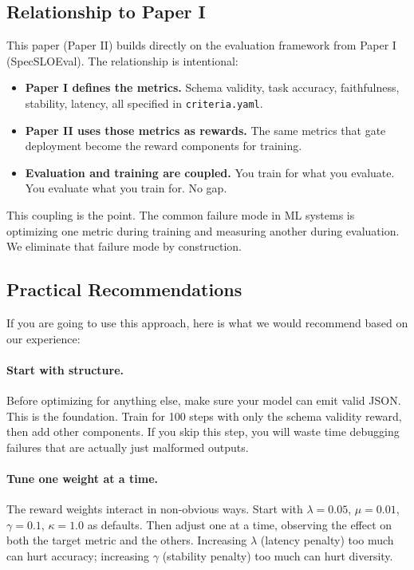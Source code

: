 \documentclass[11pt]{article}
\begin{document}
\subsection{Relationship to Paper I}

This paper (Paper II) builds directly on the evaluation framework from Paper I (SpecSLOEval).
The relationship is intentional:

\begin{itemize}[leftmargin=12pt]
    \item \textbf{Paper I defines the metrics.} Schema validity, task accuracy, faithfulness, stability, latency, all specified in \texttt{criteria.yaml}.
    \item \textbf{Paper II uses those metrics as rewards.} The same metrics that gate deployment become the reward components for training.
    \item \textbf{Evaluation and training are coupled.} You train for what you evaluate.  You evaluate what you train for.  No gap.
\end{itemize}

This coupling is the point.
The common failure mode in ML systems is optimizing one metric during training and measuring another during evaluation.
We eliminate that failure mode by construction.

\subsection{Practical Recommendations}

If you are going to use this approach, here is what we would recommend based on our experience:

\paragraph{Start with structure.}
Before optimizing for anything else, make sure your model can emit valid JSON.
This is the foundation.
Train for 100 steps with only the schema validity reward, then add other components.
If you skip this step, you will waste time debugging failures that are actually just malformed outputs.

\paragraph{Tune one weight at a time.}
The reward weights interact in non-obvious ways.
Start with $\lambda = 0.05$, $\mu = 0.01$, $\gamma = 0.1$, $\kappa = 1.0$ as defaults.
Then adjust one at a time, observing the effect on both the target metric and the others.
Increasing $\lambda$ (latency penalty) too much can hurt accuracy; increasing $\gamma$ (stability penalty) too much can hurt diversity.
\end{document}
